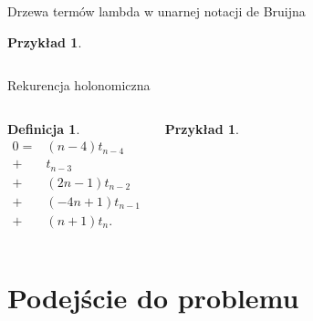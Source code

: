\documentclass[final]{beamer}
\theoremstyle{bluetheorem}
\theoremstyle{bluetheorem}
\newtheorem{mydefinition}[mytheorem]{Definicja}
\theoremstyle{greentheorem}
\newtheorem{myexample}[mytheorem]{Przykład}
\newcommand{\includeinlinescaledsvg}[3]{\begin{minipage}{#1\textwidth}\begin{center}\end{center}\end{minipage}}
\begin{document}
\begin{frame}{Drzewa termów lambda w unarnej notacji de Bruijna}
    \begin{myexample}
        \begin{columns}
            \begin{center}
                \includeinlinescaledsvg{1}{0.6}{lambda__tree_structure__deBruijn_002_no_green_custom}
            \end{center}
            \begin{center}
                    \raisebox{.25\textwidth}{$\equiv$}
            \end{center}
            \begin{center}
                \includeinlinescaledsvg{1}{0.6}{lambda__tree_structure__deBruijn_002_custom}
            \end{center}
        \end{columns}
    \end{myexample}
\end{frame}

\begin{frame}{Rekurencja holonomiczna}
    \begin{columns}
        \begin{mydefinition}
            \[\begin{array}{rl}
                    0 =& (n - 4) t_{n - 4}\\
                    +& t_{n - 3}\\
                    +& (2 n - 1) t_{n - 2}\\
                    +& (-4 n + 1) t_{n - 1}\\
                    +& (n + 1) t_{n}.
            \end{array}\]
        \end{mydefinition}

        \begin{myexample}
            \begin{center}
                \includeinlinescaledsvg{1}{0.6}{lambda__tree_structure__deBruijn_002_no_pointers}
            \end{center}
        \end{myexample}
    \end{columns}
\end{frame}

\section{Podejście do problemu}
\end{document}
